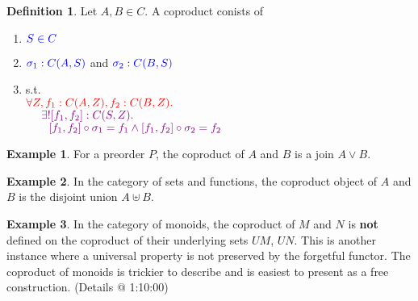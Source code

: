 \documentclass[12pt]{article}
\theoremstyle{definition}
\newtheorem{example}{Example}[section]
\newtheorem{definition}{Definition}[section]
\newcommand{\purple}[1]{\textcolor{violet}{#1}}
\begin{document}
\begin{definition}
    Let $A,B \in C$. A coproduct conists of 
    \begin{enumerate}
        \item $\textcolor{blue}{S \in C}$
        \item $\textcolor{blue}{\sigma_1 : C(A,S)}$ and $\textcolor{blue}{\sigma_2 : C(B,S)}$
        \item s.t. \\$\textcolor{red}{\forall Z,f_1:C(A,Z),f_2:C(B,Z).\;}$\\
        $\text{\quad}\ \purple{\exists![f_1,f_2]:C(S,Z).}$\\
        $\text{\quad\quad}\purple{[f_1,f_2] \circ \sigma_1=f_1 \land [f_1,f_2] \circ \sigma_2 = f_2}$
    \end{enumerate}
\end{definition}
\begin{figure}[!h]
    \centering

\end{figure}
\begin{example}
    For a preorder $P$, the coproduct of $A$ and $B$ is a join $A \lor B$.
\end{example}

\begin{example}
    In the category of sets and functions, the coproduct object of $A$ and $B$ is the disjoint union $A \uplus B$.
\end{example}

\begin{example}
    In the category of monoids, the coproduct of $M$ and $N$ is \textbf{not} defined on the coproduct of their underlying sets $UM$, $UN$. This is another instance where a universal property is not preserved by the forgetful functor. The coproduct of monoids is trickier to describe and is easiest to present as a free construction. (Details @ 1:10:00)
\end{example}
\end{document}
